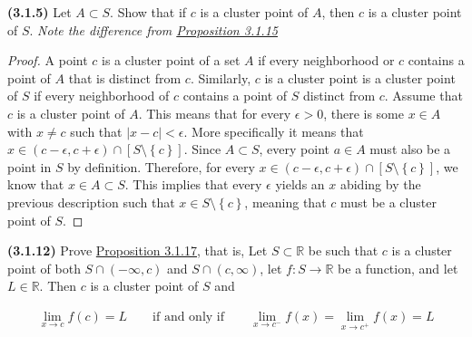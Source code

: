 \documentclass[12pt]{article}
\newcommand{\set}[1]{\left\{ {#1} \right\}}
\newcommand{\limit}[1]{\displaystyle \lim_{ {#1} }}
\newcommand{\abs}[1]{\left| {#1} \right|}
\newcommand{\paren}[1]{\left( {#1} \right)}
\newcommand{\bR}{\mathbb{R}}
\begin{document}
\pagestyle{fancy}
\setlength{\headheight}{14.49998pt}
\fancyfoot[C]{\thepage}

\noindent \textbf{(3.1.5)} Let $A\subset S$. Show that if $c$ is a cluster point of $A$, then $c$ is a cluster point of $S$. \textit{Note the difference from \underline{Proposition 3.1.15}}

\begin{proof}
	A point $c$ is a cluster point of a set $A$ if every neighborhood or $c$ contains a point of $A$ that is distinct from $c$. Similarly, $c$ is a cluster point is a cluster point of $S$ if every neighborhood of $c$ contains a point of $S$ distinct from $c$. Assume that $c$ is a cluster point of $A$. This means that for every $\epsilon>0$, there is some $x\in A$ with $x\neq c$ such that $\abs{x-c}<\epsilon$. More specifically it means that $x\in\paren{c-\epsilon, c+\epsilon}\cap [S\setminus\set{c}]$. Since $A\subset S$, every point $a\in A$ must also be a point in $S$ by definition. Therefore, for every $x\in\paren{c-\epsilon, c+\epsilon}\cap [S\setminus\set{c}]$, we know that $x\in A\subset S$. This implies that every $\epsilon$ yields an $x$ abiding by the previous description such that $x\in S\setminus\set{c}$, meaning that $c$ must be a cluster point of $S$.
\end{proof}

\newpage

\noindent \textbf{(3.1.12)} Prove \underline{Proposition 3.1.17}, that is, Let $S\subset\bR$ be such that $c$ is a cluster point of both $S\cap\paren{-\infty, c}$ and $S\cap\paren{c,\infty}$, let $f:S\to\bR$ be a function, and let $L\in\bR$. Then $c$ is a cluster point of $S$ and

\begin{align*}
	\limit{x\to c}f(c)=L\qquad\text{if and only if}\qquad\limit{x\to c^-}f(x)=\limit{x\to c^+}f(x)=L
\end{align*}
\end{document}
